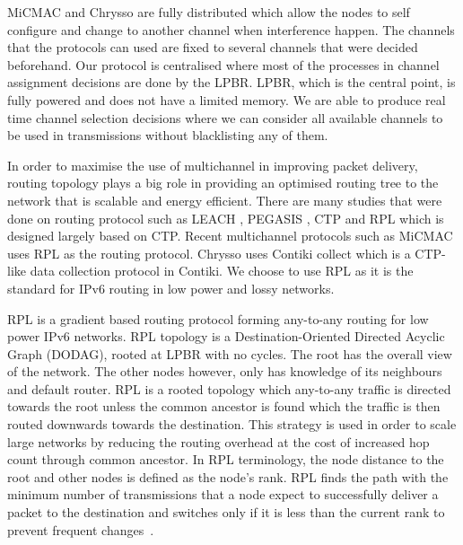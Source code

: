 MiCMAC and Chrysso are fully distributed which allow the nodes to self configure and change to another channel when interference happen. The channels that the protocols can used are fixed to several channels that were decided beforehand. Our protocol is centralised where most of the processes in channel assignment decisions are done by the LPBR. LPBR, which is the central point, is fully powered and does not have a limited memory. We are able to produce real time channel selection decisions where we can consider all available channels to be used in transmissions without blacklisting any of them.  


In order to maximise the use of multichannel in improving packet delivery, routing topology plays a big role in providing an optimised routing tree to the network that is scalable and energy efficient. There are many studies that were done on routing protocol such as LEACH \cite{leach}, PEGASIS \cite{pegasis}, CTP \cite{ctp} and RPL which is designed largely based on CTP. Recent multichannel protocols such as MiCMAC uses RPL as the routing protocol. Chrysso uses Contiki collect which is a CTP-like data collection protocol in Contiki. We choose to use RPL as it is the standard for IPv6 routing in low power and lossy networks. %

RPL is a gradient based routing protocol forming any-to-any routing for low power IPv6 networks. RPL topology is a Destination-Oriented Directed Acyclic Graph (DODAG), rooted at LPBR with no cycles. The root has the overall view of the network. The other nodes however, only has knowledge of its neighbours and default router. RPL is a rooted topology which any-to-any traffic is directed towards the root unless the common ancestor is found which the traffic is then routed downwards towards the destination. This strategy is used in order to scale large networks by reducing the routing overhead at the cost of increased hop count through common ancestor. In RPL terminology, the node distance to the root and other nodes is defined as the node's rank. RPL finds the path with the minimum number of transmissions that a node expect to successfully deliver a packet to the destination and switches only if it is less than the current rank to prevent frequent changes~\cite{mrhof}. 


